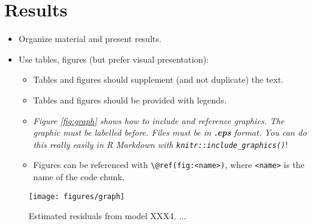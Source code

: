 \documentclass[11pt, a4paper, twosided]{book}
\begin{document}
\hypertarget{results}{%
\chapter{Results}\label{results}}
\begin{itemize}
\item
  Organize material and present results.
\item
  Use tables, figures (but prefer visual presentation):
  \begin{itemize}
  \item
    Tables and figures should supplement (and not duplicate) the text.
  \item
    Tables and figures should be provided with legends.
  \item
    \emph{Figure \ref{fig:graph} shows how to include and reference graphics.
    The graphic must be labelled before. Files must be in \textbf{.eps} format. You
    can do this really easily in R Markdown with \texttt{knitr::include\_graphics()}}!
  \item
    Figures can be referenced with \texttt{\textbackslash{}@ref(fig:\textless{}name\textgreater{})}, where \texttt{\textless{}name\textgreater{}} is the
    name of the code chunk.
  \end{itemize}
\end{itemize}
\begin{figure}

{\centering \texttt{[image: figures/graph]} 

}

\caption{Estimated residuals from model XXX4. ...}\label{fig:graph4}
\end{figure}
\end{document}
